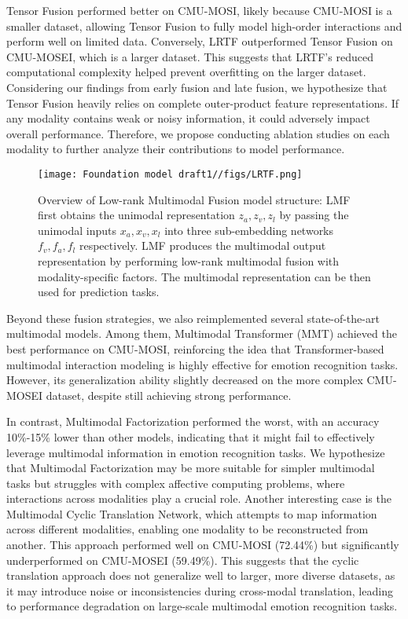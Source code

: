 \documentclass{article}
\begin{document}
Tensor Fusion performed better on CMU-MOSI, likely because CMU-MOSI is a smaller dataset, allowing Tensor Fusion to fully model high-order interactions and perform well on limited data. Conversely, LRTF outperformed Tensor Fusion on CMU-MOSEI, which is a larger dataset. This suggests that LRTF’s reduced computational complexity helped prevent overfitting on the larger dataset. Considering our findings from early fusion and late fusion, we hypothesize that Tensor Fusion heavily relies on complete outer-product feature representations. If any modality contains weak or noisy information, it could adversely impact overall performance. Therefore, we propose conducting ablation studies on each modality to further analyze their contributions to model performance.

\begin{figure}[h]
    \centering
    \texttt{[image: Foundation model draft1//figs/LRTF.png]}
    \caption{Overview of Low-rank Multimodal Fusion model structure: LMF first obtains the unimodal representation $z_a, z_v, z_l$ by passing the unimodal inputs $x_a, x_v, x_l$ into three sub-embedding networks $f_v, f_a, f_l$ respectively. LMF produces the multimodal output representation by performing low-rank multimodal fusion with modality-specific factors. The multimodal representation can be then used for prediction tasks. \cite{Liu2018EfficientLM} }
    
    \label{fig:LRTF}
\end{figure}

Beyond these fusion strategies, we also reimplemented several state-of-the-art multimodal models. Among them, Multimodal Transformer (MMT) achieved the best performance on CMU-MOSI, reinforcing the idea that Transformer-based multimodal interaction modeling is highly effective for emotion recognition tasks. However, its generalization ability slightly decreased on the more complex CMU-MOSEI dataset, despite still achieving strong performance. 

In contrast, Multimodal Factorization performed the worst, with an accuracy 10\%-15\% lower than other models, indicating that it might fail to effectively leverage multimodal information in emotion recognition tasks. We hypothesize that Multimodal Factorization may be more suitable for simpler multimodal tasks but struggles with complex affective computing problems, where interactions across modalities play a crucial role. Another interesting case is the Multimodal Cyclic Translation Network, which attempts to map information across different modalities, enabling one modality to be reconstructed from another. This approach performed well on CMU-MOSI (72.44\%) but significantly underperformed on CMU-MOSEI (59.49\%). This suggests that the cyclic translation approach does not generalize well to larger, more diverse datasets, as it may introduce noise or inconsistencies during cross-modal translation, leading to performance degradation on large-scale multimodal emotion recognition tasks.
\end{document}
